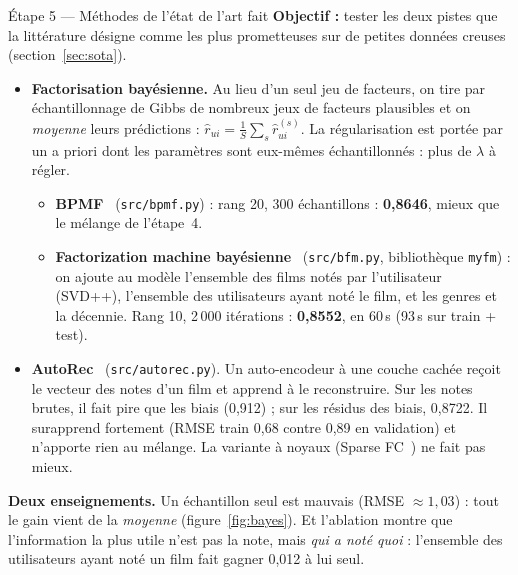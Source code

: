 \documentclass[11pt,a4paper]{article}
\newcommand{\rhat}{\hat r}
\begin{document}
\begin{etape}{Étape 5 --- Méthodes de l'état de l'art \hfill \textcolor{ok}{fait}}
\textbf{Objectif :} tester les deux pistes que la littérature désigne comme les
plus prometteuses sur de petites données creuses (section~\ref{sec:sota}).

\begin{itemize}
  \item \textbf{Factorisation bayésienne.} Au lieu d'un seul jeu de facteurs,
        on tire par échantillonnage de Gibbs de nombreux jeux de facteurs
        plausibles et on \emph{moyenne} leurs prédictions :
        $\rhat_{ui} = \frac1S \sum_{s} \rhat^{(s)}_{ui}$. La régularisation est
        portée par un a priori dont les paramètres sont eux-mêmes échantillonnés :
        plus de $\lambda$ à régler.
        \begin{itemize}
          \item \textbf{BPMF}~\cite{bpmf} (\texttt{src/bpmf.py}) : rang 20,
                300 échantillons : \textbf{0,8646}, mieux que le mélange de
                l'étape~4.
          \item \textbf{Factorization machine bayésienne}~\cite{rendle2019}
                (\texttt{src/bfm.py}, bibliothèque \texttt{myfm}) : on ajoute au
                modèle l'ensemble des films notés par l'utilisateur (SVD++),
                l'ensemble des utilisateurs ayant noté le film, et les genres et
                la décennie. Rang 10, 2\,000 itérations : \textbf{0,8552}, en 60\,s
                (93\,s sur train + test).
        \end{itemize}
  \item \textbf{AutoRec}~\cite{autorec} (\texttt{src/autorec.py}). Un
        auto-encodeur à une couche cachée reçoit le vecteur des notes d'un film et
        apprend à le reconstruire. Sur les notes brutes, il fait pire que les
        biais (0,912) ; sur les résidus des biais, 0,8722. Il surapprend
        fortement (RMSE train 0,68 contre 0,89 en validation) et n'apporte rien
        au mélange. La variante à noyaux (Sparse FC~\cite{sparsefc}) ne fait pas
        mieux.
\end{itemize}

\textbf{Deux enseignements.} Un échantillon seul est mauvais (RMSE $\approx 1{,}03$) :
tout le gain vient de la \emph{moyenne} (figure~\ref{fig:bayes}). Et l'ablation montre
que l'information la plus utile n'est pas la note, mais \emph{qui a noté quoi} :
l'ensemble des utilisateurs ayant noté un film fait gagner 0,012 à lui seul.
\end{etape}
\end{document}
